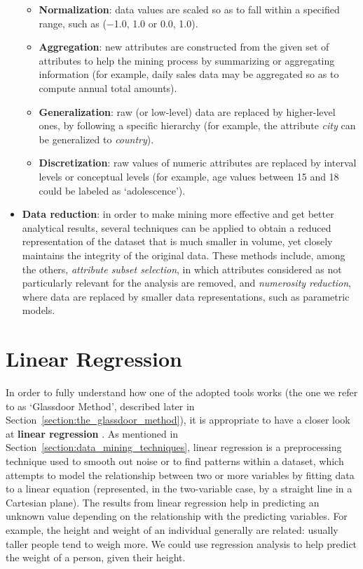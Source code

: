 \begin{itemize}
\begin{itemize}
\item \textbf{Normalization}: data values are scaled so as to fall within a specified range, such as (\(-\)1.0, 1.0 or 0.0, 1.0).
\item \textbf{Aggregation}: new attributes are constructed from the given set of attributes to help the mining process by summarizing or aggregating information (for example, daily sales data may be aggregated so as to compute annual total amounts).
\item \textbf{Generalization}: raw (or low-level) data are replaced by higher-level ones, by following a specific hierarchy (for example, the attribute \textit{city} can be generalized to \textit{country}).
\item \textbf{Discretization}: raw values of numeric attributes are replaced by interval levels or conceptual levels (for example, age values between 15 and 18 could be labeled as `adolescence').
\end{itemize}
\item \textbf{Data reduction}: in order to make mining more effective and get better analytical results, several techniques can be applied to obtain a reduced representation of the dataset that is much smaller in volume, yet closely maintains the integrity of the original data. These methods include, among the others, \textit{attribute subset selection}, in which attributes considered as not particularly relevant for the analysis are removed, and \textit{numerosity reduction}, where data are replaced by smaller data representations, such as parametric models.
\end{itemize}


\section{Linear Regression}
\label{section:linear_regression}
In order to fully understand how one of the adopted tools works (the one we refer to as `Glassdoor Method', described later in Section~\ref{section:the_glassdoor_method}), it is appropriate to have a closer look at \textbf{linear regression} \cite{glasserman2001linear}. As mentioned in Section~\ref{section:data_mining_techniques}, linear regression is a preprocessing technique used to smooth out noise or to find patterns within a dataset, which attempts to model the relationship between two or more variables by fitting data to a linear equation (represented, in the two-variable case, by a straight line in a Cartesian plane). The results from linear regression help in predicting an unknown value depending on the relationship with the predicting variables. For example, the height and weight of an individual generally are related: usually taller people tend to weigh more. We could use regression analysis to help predict the weight of a person, given their height.

